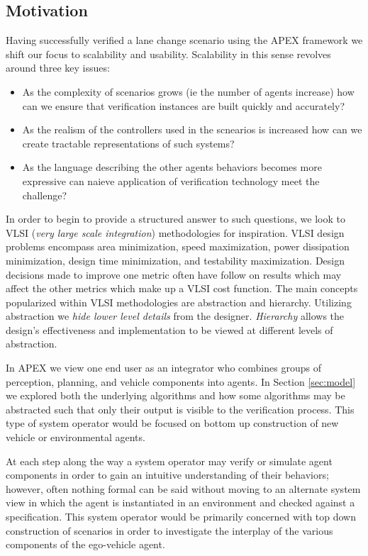 \subsection{Motivation}
Having successfully verified a lane change scenario using the APEX framework we shift our focus to scalability and usability. Scalability in this sense revolves around three key issues: 
\begin{itemize}
	\item As the complexity of scenarios grows (ie the number of agents increase) how can we ensure that verification instances are built quickly and accurately?
	\item As the realism of the controllers used in the scnearios is increased how can we create tractable representations of such systems?
	\item As the language describing the other agents behaviors becomes more expressive can naieve application of verification technology meet the challenge?
\end{itemize}
In order to begin to provide a structured answer to such questions, we look to VLSI (\emph{very large scale integration}) methodologies for inspiration. VLSI design problems encompass area minimization, speed maximization, power dissipation minimization, design time minimization, and testability maximization. Design decisions made to improve one metric often have follow on results which may affect the other metrics which make up a VLSI cost function. The main concepts popularized within VLSI methodologies are abstraction and hierarchy. Utilizing abstraction we \emph{hide lower level details} from the designer. \emph{Hierarchy} allows the design's effectiveness and implementation to be viewed at different levels of abstraction. 

In APEX we view one end user as an integrator who combines groups of perception, planning, and vehicle components into agents. In Section \ref{sec:model} we explored both the underlying algorithms and how some algorithms may be abstracted such that only their output is visible to the verification process. This type of system operator would be focused on bottom up construction of new vehicle or environmental agents.

 At each step along the way a system operator may verify or simulate agent components in order to gain an intuitive understanding of their behaviors; however, often nothing formal can be said without moving to an alternate system view in which the agent is instantiated in an environment and checked against a specification. This system operator would be primarily concerned with top down construction of scenarios in order to investigate the interplay of the various components of the ego-vehicle agent. 

